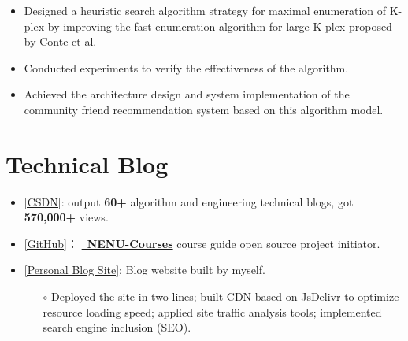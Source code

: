 \documentclass{resume}
\begin{document}
\begin{itemize}
    \item Designed a heuristic search algorithm strategy for maximal enumeration of K-plex by improving the fast enumeration 
    algorithm for large K-plex proposed by Conte et al. 
    \item Conducted experiments to verify the effectiveness of the algorithm.
    \item Achieved the architecture design and system implementation of the community friend recommendation system based on this 
    algorithm model.
\end{itemize}

\section{Technical Blog}
\begin{itemize}
    \item \href{https://blog.csdn.net/liangllhahaha?type=blog}{[CSDN]}: output \textbf{60+} algorithm and engineering technical 
    blogs, got \textbf{570,000+} views.

    \item \href{https://github.com/leungll}{[GitHub]}：
    \href{https://github.com/leungll/NENU-Courses}{\faGithub \ \textbf{NENU-Courses}} course guide open source project initiator.

    \item \href{https://leungll.site/about}{[Personal Blog Site]}: Blog website built by myself.
    \begin{itemize}
      \item[$\circ$] Deployed the site in two lines; built CDN based on JsDelivr to optimize resource loading speed; 
      applied site traffic analysis tools; implemented search engine inclusion (SEO).
    \end{itemize}
\end{itemize}
\end{document}
